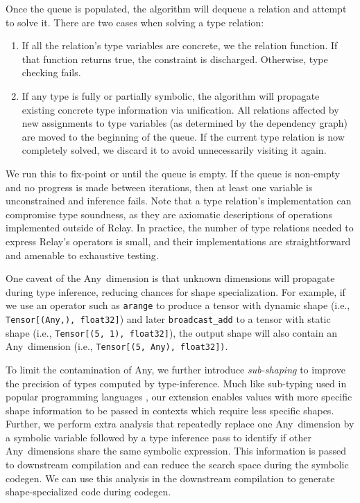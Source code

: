Once the queue is populated, the algorithm will dequeue a relation and attempt to solve it.
There are two cases when solving a type relation:
\begin{enumerate}
  \item If all the relation's type variables
  are concrete, we the relation function. If that function returns true, the
  constraint is discharged. Otherwise, type checking fails.
  \item If any type is fully or partially symbolic, the
    algorithm will propagate
    existing concrete type information via unification.
  All relations affected by new assignments to type
    variables (as determined by the dependency graph)
    are moved to the beginning of the queue.
  If the current type relation is now completely solved, we
  discard it to avoid unnecessarily visiting it again.
\end{enumerate}

We run this to fix-point or until the queue is empty.
If the queue is non-empty and no progress is made between iterations,
  then at least one variable is unconstrained and inference fails.
Note that a type relation's implementation can
  compromise type soundness, as they are axiomatic descriptions
  of operations implemented outside of Relay.
In practice, the number of type relations needed to express Relay's
  operators is small, and their implementations are straightforward
  and amenable to exhaustive testing.

One caveat of the Any~dimension is that unknown dimensions will
  propagate during type inference, reducing chances for shape specialization.
For example, if we use an operator such as {\tt arange} to produce a
  tensor with dynamic shape (i.e., \texttt{Tensor[(Any,), float32]})
  and later {\tt broadcast\_add} to a tensor with static shape (i.e., \texttt{Tensor[(5, 1), float32]}),
  the output shape will also contain an Any~dimension (i.e., \texttt{Tensor[(5, Any), float32])}.

To limit the contamination of Any, we further introduce {\em sub-shaping}
  to improve the precision of types computed by type-inference.
Much like sub-typing used in popular programming languages \citep{LiskovTPLS1994,AmadioAmadioTPLS1993},
  our extension enables values with more specific shape information to be passed in contexts which require less specific shapes.
Further, we perform extra analysis that repeatedly replace one Any~dimension by a symbolic variable followed by
  a type inference pass to identify if other Any~dimensions share the same symbolic expression.
This information is passed to downstream compilation
  and can reduce the search space during the symbolic codegen.
We can use this analysis in the downstream compilation
  to generate shape-specialized code during codegen.

